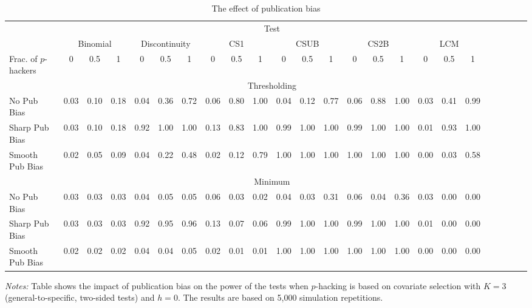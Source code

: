\begin{table}[H]
\begin{center}
\caption{The effect of publication bias}
\label{tab:publication_bias_1}
\onehalfspacing
\footnotesize
\begin{tabular}{lccccccccccccccccccccccc}
\toprule
 & \multicolumn{18}{c}{Test} \\ \cline{2-19}
 & \multicolumn{3}{c}{Binomial} & \multicolumn{3}{c}{Discontinuity} & \multicolumn{3}{c}{CS1} & \multicolumn{3}{c}{CSUB} & \multicolumn{3}{c}{CS2B} & \multicolumn{3}{c}{LCM} \\
Frac. of $p$-hackers & 0 & 0.5 & 1 & 0 & 0.5 & 1 & 0 & 0.5 & 1 & 0 & 0.5 & 1 & 0 & 0.5 & 1 & 0 & 0.5 & 1 \\ \hline
\textit{} & \multicolumn{18}{c}{Thresholding} \\ \cline{2-19}
No Pub Bias & 0.03 & 0.10 & 0.18 & 0.04 & 0.36 & 0.72 & 0.06 & 0.80 & 1.00 & 0.04 & 0.12 & 0.77 & 0.06 & 0.88 & 1.00 & 0.03 & 0.41 & 0.99 \\
Sharp Pub Bias & 0.03 & 0.10 & 0.18 & 0.92 & 1.00 & 1.00 & 0.13 & 0.83 & 1.00 & 0.99 & 1.00 & 1.00 & 0.99 & 1.00 & 1.00 & 0.01 & 0.93 & 1.00 \\
Smooth Pub Bias & 0.02 & 0.05 & 0.09 & 0.04 & 0.22 & 0.48 & 0.02 & 0.12 & 0.79 & 1.00 & 1.00 & 1.00 & 1.00 & 1.00 & 1.00 & 0.00 & 0.03 & 0.58 \\
\textit{} & \multicolumn{18}{c}{Minimum} \\ \cline{2-19}
No Pub Bias & 0.03 & 0.03 & 0.03 & 0.04 & 0.05 & 0.05 & 0.06 & 0.03 & 0.02 & 0.04 & 0.03 & 0.31 & 0.06 & 0.04 & 0.36 & 0.03 & 0.00 & 0.00 \\
Sharp Pub Bias & 0.03 & 0.03 & 0.03 & 0.92 & 0.95 & 0.96 & 0.13 & 0.07 & 0.06 & 0.99 & 1.00 & 1.00 & 0.99 & 1.00 & 1.00 & 0.01 & 0.00 & 0.00 \\
Smooth Pub Bias & 0.02 & 0.02 & 0.02 & 0.04 & 0.04 & 0.05 & 0.02 & 0.01 & 0.01 & 1.00 & 1.00 & 1.00 & 1.00 & 1.00 & 1.00 & 0.00 & 0.00 & 0.00 \\
\bottomrule
\end{tabular}
\end{center}
\doublespacing\textit{Notes:} Table shows the impact of publication bias on the power of the tests when $p$-hacking is based on covariate selection with $K=3$ (general-to-specific, two-sided tests) and $h=0$. The results are based on 5,000 simulation repetitions.
\end{table}
